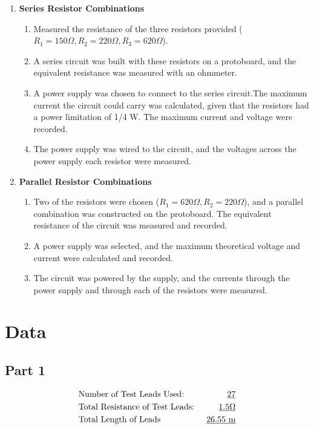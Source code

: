 \documentclass[twocolumn,english]{IEEEtran}
\theoremstyle{plain}
\theoremstyle{plain}
\begin{document}
\begin{enumerate}
 \item \textbf{Series Resistor Combinations} \begin{enumerate}
        \item Measured the resistance of the three resistors provided ($R_1 = 150 \Omega, R_2 = 220 \Omega, R_3 = 620 \Omega$).
        \item A series circuit was built with these resistors on a protoboard, and the equivalent resistance was measured with an ohmmeter.
        \item A power supply was chosen to connect to the series circuit.The maximum current the circuit could carry was calculated, given that the resistors had a power limitation of 1/4 W. The maximum current and voltage were recorded.
        \item The power supply was wired to the circuit, and the voltages across the power supply each resistor were measured.
       \end{enumerate}
  \item \textbf{Parallel Resistor Combinations} \begin{enumerate}
         \item Two of the resistors were chosen ($R_1=620 \Omega, R_2=220 \Omega$), and a parallel combination was constructed on the protoboard. The equivalent resistance of the circuit was measured and recorded.
         \item A power supply was selected, and the maximum theoretical voltage and current were calculated and recorded.
         \item The circuit was powered by the supply, and the currents through the power supply and through each of the resistors were measured.
        \end{enumerate}
\end{enumerate}

\section{Data}
  \subsection*{\textbf{Part 1}}
  \begin{align*}
   &\text{Number of Test Leads Used:}		&\text{\underline{27}} \\
   &\text{Total Resistance of Test Leads: }	&\text{\underline{1.5$\Omega$}} \\
   &\text{Total Length of Leads }		&\text{\underline{26.55 m}}
  \end{align*}
\end{document}

